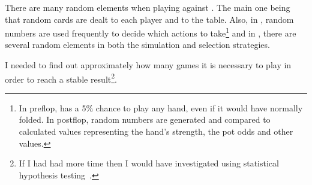 There are many random elements when playing \sbt against \mbt. The main one being that random cards are dealt to each player and to the table. Also, in \sbt, random numbers are used frequently to decide which actions to take\footnote{In preflop, \sbt has a 5\% chance to play any hand, even if it would have normally folded. In postflop, random numbers are generated and compared to calculated values representing the hand's strength, the pot odds and other values.} and in \mbt, there are several random elements in both the simulation and selection strategies.


I needed to find out approximately how many games it is necessary to play in order to reach a stable result\footnote{If I had had more time then I would have investigated using statistical hypothesis testing~\cite{hypothesis}.}.




